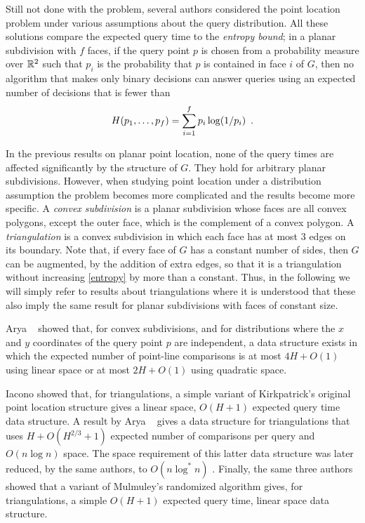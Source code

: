 \documentclass[charterfonts,lotsofwhite]{patmorin}
\begin{document}
Still not done with the problem, several authors considered the point
location problem under various assumptions about the query
distribution.  All these solutions compare the expected query time to
the \emph{entropy bound};  in a planar subdivision with $f$ faces, if the query
point $p$ is chosen from a probability measure over $\mathbb{R}^2$ such that
$p_i$ is the probability that $p$ is contained in face $i$ of $G$,
then no algorithm that makes only binary decisions can answer queries
using an expected number of decisions that is fewer than 
\begin{equation}
    H(p_1,\ldots,p_f) = \sum_{i=1}^f p_i\log(1/p_i) \enspace . \eqlabel{entropy}
\end{equation}

In the previous results on planar point location,
none of the query times are affected
significantly by the structure of $G$.  They hold for arbitrary planar
subdivisions.  However, when studying point location under a
distribution assumption the problem becomes more complicated and the
results become more specific.  A \emph{convex subdivision} is a planar
subdivision whose faces are all convex polygons, except the outer
face, which is the complement of a convex polygon.  A
\emph{triangulation} is a convex subdivision in which each face has at
most 3 edges on its boundary.  Note that, if every face of $G$ has a
constant number of sides, then $G$ can be augmented, by the addition
of extra edges, so that it is a triangulation without increasing
\eqref{entropy} by more than a constant.  Thus, in the following we
will simply refer to results about triangulations where it is
understood that these also imply the same result for planar
subdivisions with faces of constant size.

Arya \etal\ \cite{acmr00} showed that, for convex subdivisions, and for
distributions where the $x$ and $y$ coordinates of the query point $p$ are
independent, a data structure exists in which the expected number of
point-line comparisons is at most $4H+O(1)$ using linear space or at
most $2H+O(1)$ using quadratic space.

Iacono \cite{i01,i04} showed that, for triangulations, a simple
variant of Kirkpatrick's original point location structure gives a
linear space, $O(H+1)$ expected query time data structure.  A result
by Arya \etal\ \cite{amm00} gives a data structure for triangulations
that uses $H + O(H^{2/3}+1)$ expected number of comparisons per query
and $O(n\log n)$ space.  The space requirement of this latter
data structure was later reduced, by the same authors, to $O(n\log^* n)$
\cite{amm01a}.  Finally, the same three authors \cite{amm01b} showed
that a variant of Mulmuley's randomized algorithm gives, for
triangulations, a simple $O(H+1)$ expected query time, linear space
data structure.
\end{document}
